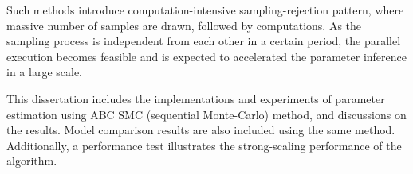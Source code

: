 Such methods introduce computation-intensive sampling-rejection pattern, where massive number of samples are drawn, followed by computations. As the sampling process is independent from each other in a certain period, the parallel execution becomes feasible and is expected to accelerated the parameter inference in a large scale.

This dissertation includes the implementations and experiments of parameter estimation using ABC SMC (sequential Monte-Carlo) method, and discussions on the results. Model comparison results are also included using the same method. Additionally, a performance test illustrates the strong-scaling performance of the algorithm.

